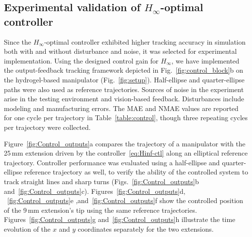 \subsection{Experimental validation of $H_\infty$-optimal controller}

Since the $H_\infty$-optimal controller exhibited higher tracking accuracy in simulation both with and without disturbance and noise, it was selected for experimental implementation. Using the designed control gain for $H_\infty$, we have implemented the output-feedback tracking framework depicted in Fig.~\ref{fig:control_block}b on the hydrogel-based manipulator (Fig.~\ref{fig:setup}). Half-ellipse and quarter-ellipse paths were also used as reference trajectories. Sources of noise in the experiment arise in the testing environment and vision-based feedback. Disturbances include modeling and manufacturing errors.  The MAE and NMAE values are reported for one cycle per trajectory in Table~\ref{table:control}, though three repeating cycles per trajectory were collected.

Figure~\ref{fig:Control_outputs}a compares the trajectory of a manipulator with the 25\,mm extension driven by the controller~\eqref{eq:Hinf-ctl} along an elliptical reference trajectory. Controller performance was evaluated using a half-ellipse and quarter-ellipse reference trajectory as well, to verify the ability of the controlled system to track straight lines and sharp turns (Figs.~\ref{fig:Control_outputs}b and~\ref{fig:Control_outputs}c). Figures~\ref{fig:Control_outputs}d, ~\ref{fig:Control_outputs}e ,and~\ref{fig:Control_outputs}f show the controlled position of the 9\,mm extension's tip using the same reference trajectories. Figures~\ref{fig:Control_outputs}g and~\ref{fig:Control_outputs}h illustrate the time evolution of the $x$ and $y$ coordinates separately for the two extensions.

